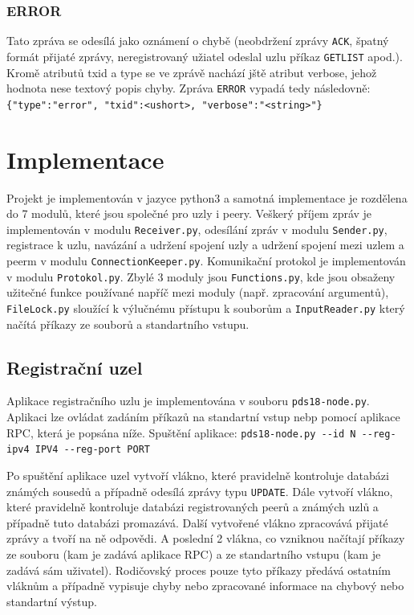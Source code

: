 \documentclass[11pt,a4paper,titlepage]{article}
\begin{document}
            \subsubsection{ERROR}
                Tato zpráva se odesílá jako oznámení o chybě (neobdržení zprávy \texttt{ACK}, špatný formát přijaté zprávy, neregistrovaný užiatel
                odeslal uzlu příkaz \texttt{GETLIST} apod.). Kromě atributů txid a type se ve zprávě nachází jště atribut verbose, jehož
                hodnota nese textový popis chyby. Zpráva \texttt{ERROR} vypadá tedy následovně: \verb+{"type":"error", "txid":<ushort>, "verbose":"<string>"}+

    \section{Implementace}
        Projekt je implementován v jazyce python3 a samotná implementace je rozdělena do 7 modulů, které jsou společné pro uzly i peery.
        Veškerý příjem zpráv je implementován v modulu \texttt{Receiver.py}, odesílání zpráv v modulu \texttt{Sender.py}, registrace k uzlu,
        navázání a udržení spojení uzly a udržení spojení mezi uzlem a peerm v modulu \texttt{ConnectionKeeper.py}. Komunikační protokol je
        implementován v modulu \texttt{Protokol.py}. Zbylé 3 moduly jsou \texttt{Functions.py},
        kde jsou obsaženy užitečné funkce používané napříč mezi moduly (např. zpracování argumentů), \texttt{FileLock.py} sloužící k výlučnému přístupu
        k souborům a \texttt{InputReader.py} který načítá příkazy ze souborů a standartního vstupu.

        \subsection{Registrační uzel}
            Aplikace registračního uzlu je implementována v souboru \texttt{pds18-node.py}. Aplikaci lze ovládat zadáním příkazů na
            standartní vstup nebp pomocí aplikace RPC, která je popsána níže. Spuštění aplikace:
            \verb+pds18-node.py --id N --reg-ipv4 IPV4 --reg-port PORT+

            Po spuštění aplikace uzel vytvoří vlákno, které pravidelně kontroluje databázi známých sousedů a případně odesílá
            zprávy typu \texttt{UPDATE}. Dále vytvoří vlákno, které pravidelně kontroluje databázi registrovaných peerů a
            známých uzlů a případně tuto databázi promazává. Další vytvořené vlákno zpracovává přijaté zprávy a tvoří na ně
            odpovědi. A poslední 2 vlákna, co vzniknou načítají příkazy ze souboru (kam je zadává aplikace RPC) a ze standartního
            vstupu (kam je zadává sám uživatel). Rodičovský proces pouze tyto příkazy předává ostatním vláknům a případně vypisuje
            chyby nebo zpracované informace na chybový nebo standartní výstup.
\end{document}
